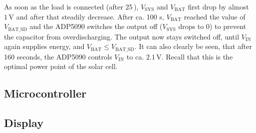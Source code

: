 As soon as the load is connected (after 25\,), $V_{\text{SYS}}$ and $V_{\text{BAT}}$ first drop by almost $1\,\text{V}$ and after that steadily decrease.
After ca. 100 s, $V_{\text{BAT}}$ reached the value of $V_{\text{BAT\_SD}}$ and the ADP5090 switches the output off ($V_{\text{SYS}}$ drops to 0) to prevent the capacitor from overdischarging.
The output now stays switched off, until $V_{\text{IN}}$ again supplies energy, and $V_{\text{BAT}} \le V_{\text{BAT\_SD}}$.
It can also clearly be seen, that after 160 seconds, the ADP5090 controls $V_{\text{IN}}$ to ca. $2.1\,\text{V}$. Recall that this is the optimal power point of the solar cell.

\subsection{Microcontroller}

\subsection{Display}

